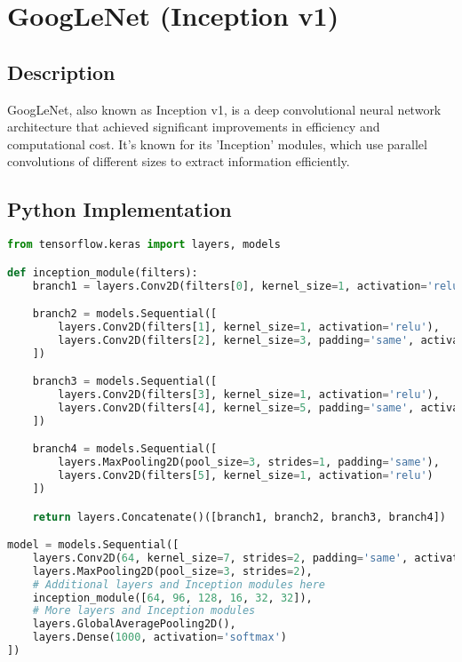 \chapter{GoogLeNet (Inception v1)}

\section{Description}
GoogLeNet, also known as Inception v1, is a deep convolutional neural network architecture that achieved significant improvements in efficiency and computational cost. It's known for its 'Inception' modules, which use parallel convolutions of different sizes to extract information efficiently.

\section{Python Implementation}
\begin{lstlisting}[language=Python]
from tensorflow.keras import layers, models

def inception_module(filters):
    branch1 = layers.Conv2D(filters[0], kernel_size=1, activation='relu')

    branch2 = models.Sequential([
        layers.Conv2D(filters[1], kernel_size=1, activation='relu'),
        layers.Conv2D(filters[2], kernel_size=3, padding='same', activation='relu')
    ])

    branch3 = models.Sequential([
        layers.Conv2D(filters[3], kernel_size=1, activation='relu'),
        layers.Conv2D(filters[4], kernel_size=5, padding='same', activation='relu')
    ])

    branch4 = models.Sequential([
        layers.MaxPooling2D(pool_size=3, strides=1, padding='same'),
        layers.Conv2D(filters[5], kernel_size=1, activation='relu')
    ])

    return layers.Concatenate()([branch1, branch2, branch3, branch4])

model = models.Sequential([
    layers.Conv2D(64, kernel_size=7, strides=2, padding='same', activation='relu'),
    layers.MaxPooling2D(pool_size=3, strides=2),
    # Additional layers and Inception modules here
    inception_module([64, 96, 128, 16, 32, 32]),
    # More layers and Inception modules
    layers.GlobalAveragePooling2D(),
    layers.Dense(1000, activation='softmax')
])
\end{lstlisting}

